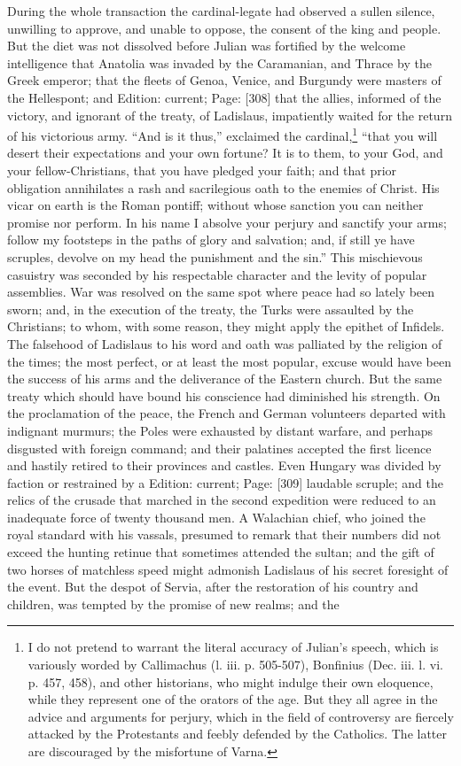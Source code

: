 During the whole transaction the cardinal-legate had observed a sullen silence, unwilling to approve, and unable to oppose, the consent of the king and people. But the diet was not dissolved before Julian was fortified by the welcome intelligence that Anatolia was invaded by the Caramanian, and Thrace by the Greek emperor; that the fleets of Genoa, Venice, and Burgundy were masters of the Hellespont; and Edition: current; Page: [308] that the allies, informed of the victory, and ignorant of the treaty, of Ladislaus, impatiently waited for the return of his victorious army. \texthebrew{“}And is it thus,\texthebrew{}” exclaimed the cardinal,\footnote{I do not pretend to warrant the literal accuracy of Julian\texthebrew{}’s speech, which is variously worded by Callimachus (l. iii. p. 505-507), Bonfinius (Dec. iii. l. vi. p. 457, 458), and other historians, who might indulge their own eloquence, while they represent one of the orators of the age. But they all agree in the advice and arguments for perjury, which in the field of controversy are fiercely attacked by the Protestants and feebly defended by the Catholics. The latter are discouraged by the misfortune of Varna.} \texthebrew{“}that you will desert their expectations and your own fortune? It is to them, to your God, and your fellow-Christians, that you have pledged your faith; and that prior obligation annihilates a rash and sacrilegious oath to the enemies of Christ. His vicar on earth is the Roman pontiff; without whose sanction you can neither promise nor perform. In his name I absolve your perjury and sanctify your arms; follow my footsteps in the paths of glory and salvation; and, if still ye have scruples, devolve on my head the punishment and the sin.\texthebrew{}” This mischievous casuistry was seconded by his respectable character and the levity of popular assemblies. War was resolved on the same spot where peace had so lately been sworn; and, in the execution of the treaty, the Turks were assaulted by the Christians; to whom, with some reason, they might apply the epithet of Infidels. The falsehood of Ladislaus to his word and oath was palliated by the religion of the times; the most perfect, or at least the most popular, excuse would have been the success of his arms and the deliverance of the Eastern church. But the same treaty which should have bound his conscience had diminished his strength. On the proclamation of the peace, the French and German volunteers departed with indignant murmurs; the Poles were exhausted by distant warfare, and perhaps disgusted with foreign command; and their palatines accepted the first licence and hastily retired to their provinces and castles. Even Hungary was divided by faction or restrained by a Edition: current; Page: [309] laudable scruple; and the relics of the crusade that marched in the second expedition were reduced to an inadequate force of twenty thousand men. A Walachian chief, who joined the royal standard with his vassals, presumed to remark that their numbers did not exceed the hunting retinue that sometimes attended the sultan; and the gift of two horses of matchless speed might admonish Ladislaus of his secret foresight of the event. But the despot of Servia, after the restoration of his country and children, was tempted by the promise of new realms; and the 